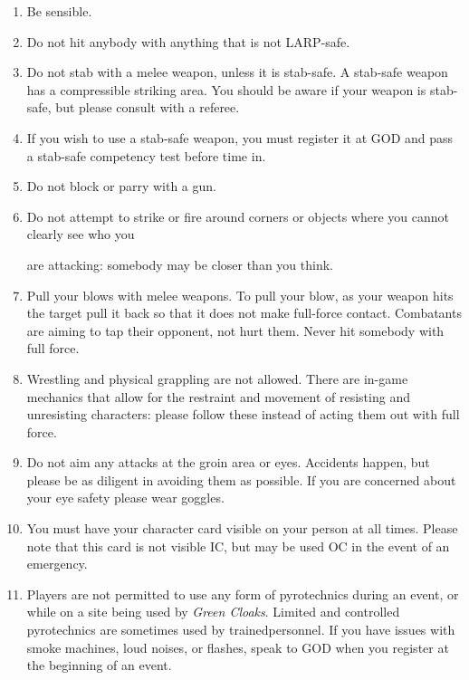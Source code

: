 \begin{enumerate}[1]

\item Be sensible.

\item Do not hit anybody with anything that is not LARP-safe.

\item Do not stab with a melee weapon, unless it is stab-safe. A stab-safe weapon has a compressible striking area. You should be aware if your weapon is stab-safe, but please consult with a referee.

\item If you wish to use a stab-safe weapon, you must register it at GOD and pass a stab-safe competency test before time in.

\item Do not block or parry with a gun.

\item Do not attempt to strike or fire around corners or objects where you cannot clearly see who you

are attacking: somebody may be closer than you think.

\item Pull your blows with melee weapons. To pull your blow, as your weapon hits the target pull it back so that it does not make full-force contact. Combatants are aiming to tap their opponent, not hurt them. Never hit somebody with full force.

\item Wrestling and physical grappling are not allowed. There are in-game mechanics that allow for the restraint and movement of resisting and unresisting characters: please follow these instead of acting them out with full force.

\item Do not aim any attacks at the groin area or eyes. Accidents happen, but please be as diligent in avoiding them as possible. If you are concerned about your eye safety please wear goggles.

\item You must have your character card visible on your person at all times. Please note that this card is not visible IC, but may be used OC in the event of an emergency.

\item Players are not permitted to use any form of pyrotechnics during an event, or while on a site being used by \textit{Green Cloaks}. Limited and controlled pyrotechnics are sometimes used by trainedpersonnel. If you have issues with smoke machines, loud noises, or flashes, speak to GOD when you register at the beginning of an event.


\end{enumerate}
